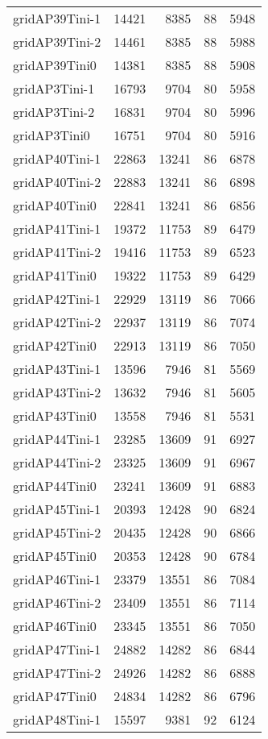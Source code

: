 \begin{longtable}{lrrrr}
gridAP39Tini-1 & 14421 & 8385 & 88 & 5948 \\
gridAP39Tini-2 & 14461 & 8385 & 88 & 5988 \\
gridAP39Tini0 & 14381 & 8385 & 88 & 5908 \\
gridAP3Tini-1 & 16793 & 9704 & 80 & 5958 \\
gridAP3Tini-2 & 16831 & 9704 & 80 & 5996 \\
gridAP3Tini0 & 16751 & 9704 & 80 & 5916 \\
gridAP40Tini-1 & 22863 & 13241 & 86 & 6878 \\
gridAP40Tini-2 & 22883 & 13241 & 86 & 6898 \\
gridAP40Tini0 & 22841 & 13241 & 86 & 6856 \\
gridAP41Tini-1 & 19372 & 11753 & 89 & 6479 \\
gridAP41Tini-2 & 19416 & 11753 & 89 & 6523 \\
gridAP41Tini0 & 19322 & 11753 & 89 & 6429 \\
gridAP42Tini-1 & 22929 & 13119 & 86 & 7066 \\
gridAP42Tini-2 & 22937 & 13119 & 86 & 7074 \\
gridAP42Tini0 & 22913 & 13119 & 86 & 7050 \\
gridAP43Tini-1 & 13596 & 7946 & 81 & 5569 \\
gridAP43Tini-2 & 13632 & 7946 & 81 & 5605 \\
gridAP43Tini0 & 13558 & 7946 & 81 & 5531 \\
gridAP44Tini-1 & 23285 & 13609 & 91 & 6927 \\
gridAP44Tini-2 & 23325 & 13609 & 91 & 6967 \\
gridAP44Tini0 & 23241 & 13609 & 91 & 6883 \\
gridAP45Tini-1 & 20393 & 12428 & 90 & 6824 \\
gridAP45Tini-2 & 20435 & 12428 & 90 & 6866 \\
gridAP45Tini0 & 20353 & 12428 & 90 & 6784 \\
gridAP46Tini-1 & 23379 & 13551 & 86 & 7084 \\
gridAP46Tini-2 & 23409 & 13551 & 86 & 7114 \\
gridAP46Tini0 & 23345 & 13551 & 86 & 7050 \\
gridAP47Tini-1 & 24882 & 14282 & 86 & 6844 \\
gridAP47Tini-2 & 24926 & 14282 & 86 & 6888 \\
gridAP47Tini0 & 24834 & 14282 & 86 & 6796 \\
gridAP48Tini-1 & 15597 & 9381 & 92 & 6124 \\

\end{longtable}
